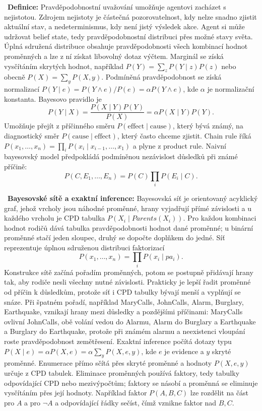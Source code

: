 \begin{odpoved}
\setlength{\parskip}{2pt}
\noindent{}\ \textbf{Definice:} Pravděpodobnostní uvažování umožňuje agentovi zacházet s nejistotou. Zdrojem nejistoty je částečná pozorovatelnost, kdy nelze snadno zjistit aktuální stav, a nedeterminismus, kdy není jistý výsledek akce. Agent si může udržovat belief state, tedy pravděpodobnostní distribuci přes možné stavy světa. Úplná sdružená distribuce obsahuje pravděpodobnosti všech kombinací hodnot proměnných a lze z ní získat libovolný dotaz výčtem. Marginál se získá vysčítáním skrytých hodnot, například $P(Y)=\sum_z P(Y\mid z)P(z)$ nebo obecně $P(X)=\sum_y P(X,y)$. Podmíněná pravděpodobnost se získá normalizací $P(Y\mid e)=P(Y\land e)/P(e)=\alpha P(Y\land e)$, kde $\alpha$ je normalizační konstanta. Bayesovo pravidlo je
\[
P(Y\mid X)=\frac{P(X\mid Y)P(Y)}{P(X)}=\alpha P(X\mid Y)P(Y).
\]
Umožňuje přejít z příčinného směru $P(\mathrm{effect}\mid\mathrm{cause})$, který bývá známý, na diagnostický směr $P(\mathrm{cause}\mid\mathrm{effect})$, který často chceme zjistit. Chain rule říká $P(x_1,\dots,x_n)=\prod_i P(x_i\mid x_{i-1},\dots,x_1)$ a plyne z product rule. Naivní bayesovský model předpokládá podmíněnou nezávislost důsledků při známé příčině:
\[
P(C,E_1,\dots,E_n)=P(C)\prod_i P(E_i\mid C).
\]\par
\noindent{}\ \textbf{Bayesovské sítě a exaktní inference:} Bayesovská síť je orientovaný acyklický graf, jehož vrcholy jsou náhodné proměnné, hrany vyjadřují přímé závislosti a u každého vrcholu je CPD tabulka $P(X_i\mid Parents(X_i))$. Pro každou kombinaci hodnot rodičů dává tabulka pravděpodobnosti hodnot dané proměnné; u binární proměnné stačí jeden sloupec, druhý se dopočte doplňkem do jedné. Síť reprezentuje úplnou sdruženou distribuci faktorizací
\[
P(x_1,\dots,x_n)=\prod_i P(x_i\mid pa_i).
\]
Konstrukce sítě začíná pořadím proměnných, potom se postupně přidávají hrany tak, aby rodiče nesli všechny nutné závislosti. Prakticky je lepší řadit proměnné od příčin k důsledkům, protože síť i CPD tabulky bývají menší a vyplňují se snáze. Při špatném pořadí, například MaryCalls, JohnCalls, Alarm, Burglary, Earthquake, vznikají hrany mezi důsledky a pozdějšími příčinami: MaryCalls ovlivní JohnCalls, obě volání vedou do Alarmu, Alarm do Burglary a Earthquake a Burglary do Earthquake, protože při známém alarmu a neexistenci vloupání roste pravděpodobnost zemětřesení. Exaktní inference počítá dotazy typu $P(X\mid e)=\alpha P(X,e)=\alpha\sum_y P(X,e,y)$, kde $e$ je evidence a $y$ skryté proměnné. Enumerace přímo sčítá přes skryté proměnné a hodnoty $P(X,e,y)$ určuje z CPD tabulek. Eliminace proměnných používá faktory, tedy tabulky odpovídající CPD nebo mezivýpočtům; faktory se násobí a proměnná se eliminuje vysčítáním přes její hodnoty. Například faktor $P(A,B,C)$ lze rozdělit na část pro $A$ a pro $\neg A$ a odpovídající řádky sečíst, čímž vznikne faktor nad $B,C$.\par

\end{odpoved}
